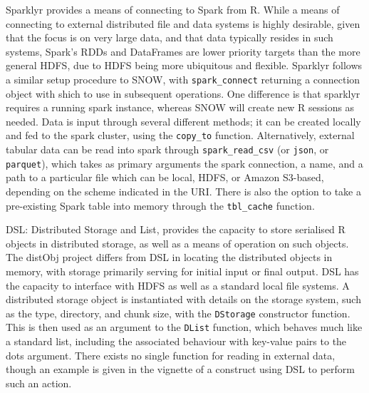 \documentclass[a4paper,10pt]{article}
\begin{document}
Sparklyr provides a means of connecting to Spark from R\cite{luraschi20}.
While a means of connecting to external distributed file and data systems is
highly desirable, given that the focus is on very large data, and that data
typically resides in such systems, Spark's RDDs and DataFrames are lower
priority targets than the more general HDFS, due to HDFS being more ubiquitous
and flexible.
Sparklyr follows a similar setup procedure to SNOW, with
\texttt{spark\_connect} returning a connection object with shich to use
in subsequent operations.
One difference is that sparklyr requires a running spark instance, whereas SNOW
will create new R sessions as needed.
Data is input through several different methods; it can be created locally and
fed to the spark cluster, using the \texttt{copy\_to} function.
Alternatively, external tabular data can be read into spark through
\texttt{spark\_read\_csv} (or \texttt{json}, or
\texttt{parquet}), which takes as primary arguments the spark
connection, a name, and a path to a particular file which can be local, HDFS,
or Amazon S3-based, depending on the scheme indicated in the URI.
There is also the option to take a pre-existing Spark table into memory through
the \texttt{tbl\_cache} function.

DSL: Distributed Storage and List, provides the capacity to store serialised R
objects in distributed storage, as well as a means of operation on such
objects\cite{theussl2020dsl}.
The distObj project differs from DSL in locating the distributed objects in
memory, with storage primarily serving for initial input or final output.
DSL has the capacity to interface with HDFS as well as a standard local file systems.
A distributed storage object is instantiated with details on the storage
system, such as the type, directory, and chunk size, with the
\texttt{DStorage} constructor function.
This is then used as an argument to the \texttt{DList} function, which
behaves much like a standard list, including the associated behaviour with
key-value pairs to the dots argument.
There exists no single function for reading in external data, though an example
is given in the vignette of a construct using DSL to perform such an action.
\end{document}

